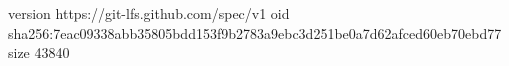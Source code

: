 version https://git-lfs.github.com/spec/v1
oid sha256:7eac09338abb35805bdd153f9b2783a9ebc3d251be0a7d62afced60eb70ebd77
size 43840
